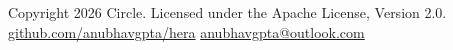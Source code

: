 \documentclass[10pt, a4paper]{article}
\begin{document}
\vspace{6mm}
\noindent{\color{herarule}\rule{\linewidth}{0.5pt}}

\vspace{4pt}
\begin{center}
  \small\color{muted}
  Copyright \textcopyright{} 2026 Circle.
  Licensed under the Apache License, Version 2.0.\\[2pt]
  \href{https://github.com/anubhavgpta/hera}{github.com/anubhavgpta/hera}
  \enspace\textbullet\enspace
  \href{mailto:anubhavgpta@outlook.com}{anubhavgpta@outlook.com}
\end{center}
\end{document}
